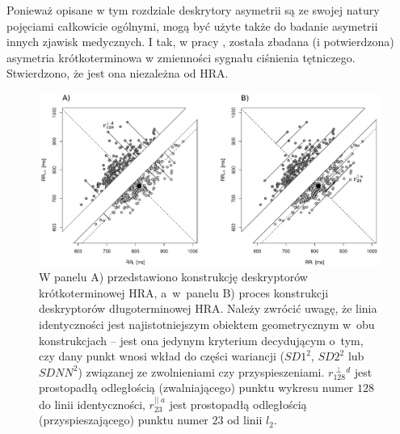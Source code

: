 Ponieważ opisane w tym rozdziale deskrytory asymetrii są ze swojej natury pojęciami
całkowicie ogólnymi, mogą być użyte także do badanie asymetrii innych zjawisk medycznych.
I tak, w pracy \cite{hypertension_asym}, została zbadana (i potwierdzona) asymetria krótkoterminowa w zmienności
sygnału ciśnienia tętniczego. Stwierdzono, że jest ona niezależna od HRA.
\begin{landscape}
\begin{figure}
\begin{center}
\includegraphics[width=1.5\textwidth]{graph/habfig2_2a.jpg}
\caption{W panelu A) przedstawiono konstrukcję deskryptorów krótkoterminowej HRA, a~w~panelu B) proces konstrukcji deskryptorów długoterminowej HRA. Należy zwrócić uwagę, że linia identyczności jest najistotniejszym obiektem geometrycznym w~obu konstrukcjach -- jest ona jedynym kryterium decydującym o~tym, czy dany punkt wnosi wkład do części wariancji ($SD1^2$, $SD2^2$ lub $SDNN^2$) związanej ze zwolnieniami czy przyspieszeniami. $r^{\perp\;d}_{128}$ jest prostopadłą odległością (zwalniającego) punktu wykresu \PP{} numer $128$ do linii identyczności, $r^{||\;a}_{23}$ jest prostopadłą odległością (przyspieszającego) punktu numer $23$ od linii $l_{2}$.\label{habfig2_2}}
\end{center}
\end{figure}
\end{landscape}
\clearpage
